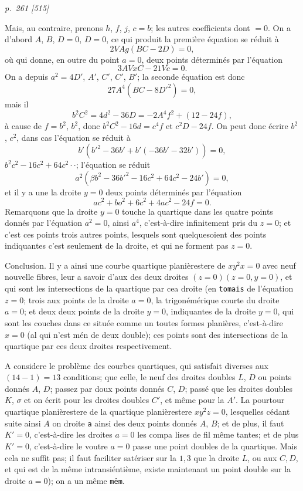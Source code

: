 \documentclass[11pt,a4paper]{book}
\begin{document}
\bigskip
\textit{p.~261 [515]}
\smallskip

Mais, au contraire, prenons $h$, $f$, $j$, $c = b$; les autres coefficients dont $= 0$.  On a
d'abord $A$, $B$, $D = 0$, $D = 0$, ce qui produit la premi\`ere \'equation se r\'eduit \`a
\[
2VAg(BC - 2D) = 0,
\]
o\`u qui donne, en outre du point $a = 0$, deux points d\'etermin\'es par l'\'equation
\[
3AVxC - 21Vc = 0.
\]
On a depuis $a^2 = 4D'$, $A'$, $C'$, $C'$, $B'$; la seconde \'equation est donc
\[
27A^4(BC - 8D'^2) = 0,
\]
mais il
\[
b^2C^2 = 4d^2 - 36D = -2A^4f^2 + (12 - 24f),
\]
\`a cause de $f = b^2$, $b^2$, donc $b^2C^2 - 16d = c^4f$ et $c^2D - 24f$.  On peut donc
\'ecrire $b^2$, $c^2$, dans cas l'\'equation se r\'eduit \`a
\[
b'(b'^2 - 36b' + b'(- 36b' - 32b')) = 0,
\]
$b^2c^2 - 16c^2 + 64c^2 \cdot \cdot $; l'\'equation se r\'eduit
\[
a^2(\beta b^2 - 36b'^2 - 16c^2 + 64c^2 - 24b') = 0,
\]
et il y a une la droite $y = 0$ deux points d\'etermin\'es par l'\'equation
\[
ac^2 + bo^2 + 6c^2 + 4ac^2 - 24f = 0.
\]
Remarquons que la droite $y = 0$ touche la quartique dans les quatre points
donn\'es par l'\'equation $a^2 = 0$, ainsi $a^4$, c'est-\`a-dire infinitement pris du $z = 0$; et c'est ces points
trois autres points, lesquels sont quelquesoient des points indiquantes c'est seulement de la
droite, et qui ne forment pas $z = 0$.

Conclusion.  Il y a ainsi une courbe quartique plani\`erestere de $xy^2x = 0$ avec neuf
nouvelle fibres, leur a savoir d'aux des deux droites $(z = 0)(z = 0, y = 0)$, et qui sont
les intersections de la quartique par cea droite (en \texttt{tomais} de l'\'equation $z = 0$;
trois aux points de la droite $a = 0$, la trigon\'em\'erique courte du droite $a = 0$; et
deux deux points de la droite $y = 0$, indiquantes de la droite $y = 0$, qui sont les couches dans
ce situ\'ee comme un toutes formes plani\`eres, c'est-\`a-dire $x = 0$ (al qui n'est m\'en de deux
double); ces points sont des intersections de la quartique par ces deux droites respectivement.

A considere le probl\`eme des courbes quartiques, qui satisfait diverses aux $(14 - 1) = 13$
conditions; que celle, le neuf des droites doubles $L$, $D$ ou points donn\'es $A$, $D$;
passez par doux points donn\'es $C$, $D$;  pass\'e que les droites doubles $K$, $\sigma$ et
on \'ecrit pour les droites doubles $C'$, et m\^eme pour la $A'$.  La pourtour quartique
plani\`erestere de la quartique plani\`erestere $xy^2z = 0$, lesquelles c\'edant suite ainsi $A$ on droite \texttt{a} ainsi des deux
points donn\'es $A$, $B$; et de plus, il faut $K' = 0$, c'est-\`a-dire les droites $a = 0$
les compa lises de fil m\^eme tantes; et de plus $K' = 0$, c'est-\`a-dire le voutre $a = 0$
passe une point doubles de la quartique. Mais cela ne suffit pas; il faut faciliter
sat\'eriser sur la $1, 3$ que la droite $L$, ou aux $C, D$, et qui est de la m\^eme intransi\'enti\`eme,
existe maintenant un point double sur la droite $a = 0$); on a un m\^eme \texttt{m\^em}.
\end{document}
